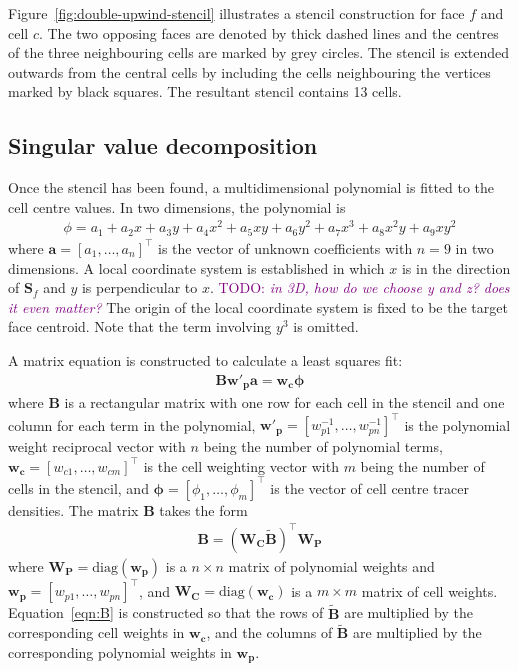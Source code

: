 \documentclass{article}
\newcommand{\TODO}[1]{\textcolor{purple}{TODO: \emph{#1}}}
\begin{document}
Figure~\ref{fig:double-upwind-stencil} illustrates a stencil construction for face $f$ and cell $c$.  The two opposing faces are denoted by thick dashed lines and the centres of the three neighbouring cells are marked by grey circles.  The stencil is extended outwards from the central cells by including the cells neighbouring the vertices marked by black squares.  The resultant stencil contains 13 cells.

\subsection{Singular value decomposition}
Once the stencil has been found, a multidimensional polynomial is fitted to the cell centre values.
In two dimensions, the polynomial is
\begin{align}
	\phi = a_1 + a_2 x + a_3 y + a_4 x^2 + a_5 xy + a_6 y^2 + a_7 x^3 + a_8 x^2 y + a_9 x y^2
\end{align}
where $\mathbf{a} = [a_1, \ldots, a_n]^\intercal$ is the vector of unknown coefficients with $n=9$ in two dimensions.  A local coordinate system is established in which $x$ is in the direction of $\mathbf{S}_f$ and $y$ is perpendicular to $x$.
\TODO{in 3D, how do we choose y and z? does it even matter?}
The origin of the local coordinate system is fixed to be the target face centroid.
Note that the term involving $y^3$ is omitted.

A matrix equation is constructed to calculate a least squares fit:
\begin{align}
	\mathbf{B} \mathbf{w'_p} \mathbf{a} = \mathbf{w_c} \bm{\phi}
\end{align}
where $\mathbf{B}$ is a rectangular matrix with one row for each cell in the stencil and one column for each term in the polynomial, $\mathbf{w'_p} = [w_{p1}^{-1}, \ldots, w_{pn}^{-1}]^\intercal$ is the polynomial weight reciprocal vector with $n$ being the number of polynomial terms,  $\mathbf{w_c} = [w_{c1}, \ldots, w_{cm}]^\intercal$ is the cell weighting vector with $m$ being the number of cells in the stencil, and $\bm{\phi} = [\phi_1, \ldots, \phi_m]^\intercal$ is the vector of cell centre tracer densities.
The matrix $\mathbf{B}$ takes the form
\begin{align}
	\mathbf{B} = \left( \mathbf{W_C} \mathbf{\tilde{B}} \right)^\intercal \mathbf{W_P} \label{eqn:B}
\end{align}
where $\mathbf{W_P} = \mathrm{diag}(\mathbf{w_p})$ is a $n \times n$ matrix of polynomial weights and $\mathbf{w_p} = [w_{p1}, \ldots, w_{pn}]^\intercal$, and $\mathbf{W_C} = \mathrm{diag}(\mathbf{w_c})$ is a $m \times m$ matrix of cell weights.  Equation~\ref{eqn:B} is constructed so that the rows of $\mathbf{\tilde{B}}$ are multiplied by the corresponding cell weights in $\mathbf{w_c}$, and the columns of $\mathbf{\tilde{B}}$ are multiplied by the corresponding polynomial weights in $\mathbf{w_p}$.
\end{document}
